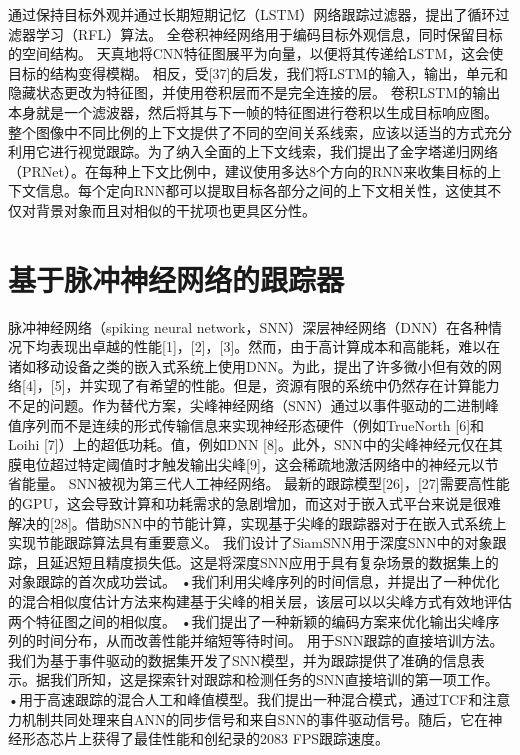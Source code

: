 \cite{RecurrentFilter} 通过保持目标外观并通过长期短期记忆（LSTM）网络跟踪过滤器，提出了循环过滤器学习（RFL）算法。 全卷积神经网络用于编码目标外观信息，同时保留目标的空间结构。 天真地将CNN特征图展平为向量，以便将其传递给LSTM，这会使目标的结构变得模糊。 相反，受[37]的启发，我们将LSTM的输入，输出，单元和隐藏状态更改为特征图，并使用卷积层而不是完全连接的层。 卷积LSTM的输出本身就是一个滤波器，然后将其与下一帧的特征图进行卷积以生成目标响应图。%
\cite{PRNet} 整个图像中不同比例的上下文提供了不同的空间关系线索，应该以适当的方式充分利用它进行视觉跟踪。为了纳入全面的上下文线索，我们提出了金字塔递归网络（PRNet）。在每种上下文比例中，建议使用多达8个方向的RNN来收集目标的上下文信息。每个定向RNN都可以提取目标各部分之间的上下文相关性，这使其不仅对背景对象而且对相似的干扰项也更具区分性。 %
\section{基于脉冲神经网络的跟踪器}%
脉冲神经网络（spiking neural network，SNN）深层神经网络（DNN）在各种情况下均表现出卓越的性能[1]，[2]，[3]。然而，由于高计算成本和高能耗，难以在诸如移动设备之类的嵌入式系统上使用DNN。为此，提出了许多微小但有效的网络[4]，[5]，并实现了有希望的性能。但是，资源有限的系统中仍然存在计算能力不足的问题。作为替代方案，尖峰神经网络（SNN）通过以事件驱动的二进制峰值序列而不是连续的形式传输信息来实现神经形态硬件（例如TrueNorth [6]和Loihi [7]）上的超低功耗。值，例如DNN [8]。此外，SNN中的尖峰神经元仅在其膜电位超过特定阈值时才触发输出尖峰[9]，这会稀疏地激活网络中的神经元以节省能量。 SNN被视为第三代人工神经网络。
最新的跟踪模型[26]，[27]需要高性能的GPU，这会导致计算和功耗需求的急剧增加，而这对于嵌入式平台来说是很难解决的[28]。借助SNN中的节能计算，实现基于尖峰的跟踪器对于在嵌入式系统上实现节能跟踪算法具有重要意义。\cite{SiamSNN} 我们设计了SiamSNN用于深度SNN中的对象跟踪，且延迟短且精度损失低。这是将深度SNN应用于具有复杂场景的数据集上的对象跟踪的首次成功尝试。 •我们利用尖峰序列的时间信息，并提出了一种优化的混合相似度估计方法来构建基于尖峰的相关层，该层可以以尖峰方式有效地评估两个特征图之间的相似度。 •我们提出了一种新颖的编码方案来优化输出尖峰序列的时间分布，从而改善性能并缩短等待时间。
\cite{DashNet} 用于SNN跟踪的直接培训方法。我们为基于事件驱动的数据集开发了SNN模型，并为跟踪提供了准确的信息表示。据我们所知，这是探索针对跟踪和检测任务的SNN直接培训的第一项工作。 •用于高速跟踪的混合人工和峰值模型。我们提出一种混合模式，通过TCF和注意力机制共同处理来自ANN的同步信号和来自SNN的事件驱动信号。随后，它在神经形态芯片上获得了最佳性能和创纪录的2083 FPS跟踪速度。%
